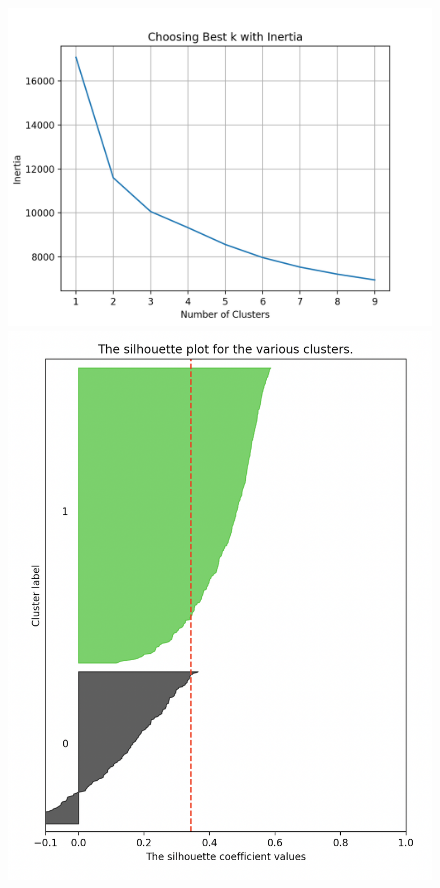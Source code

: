 \documentclass[a4paper,12pt]{article}
\begin{document}
\begin{figure}[!htb]
   \begin{minipage}{0.33\textwidth}
     \centering
     \includegraphics[width=.95\linewidth]{kmeans_inertia_1}
   \end{minipage}\hfill
    \begin{minipage}{0.33\textwidth}
     \centering
     \includegraphics[width=.95\linewidth]{sil_kmeans_11}

\end{minipage}
\end{figure}
\end{document}

